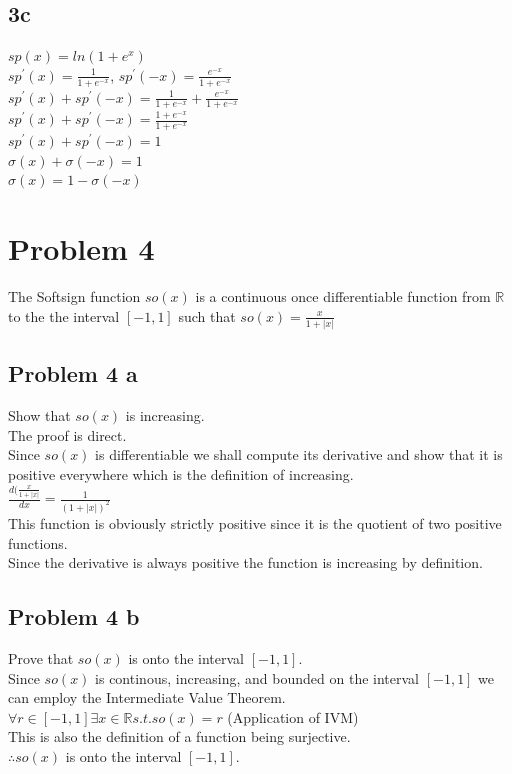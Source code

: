 \documentclass[a4paper,12pt]{article}
\begin{document}
\subsection{3c}
$sp(x)=ln(1+e^x)$\\
$sp^{'}(x) = \frac{1}{1+e^{-x}}$,  $sp^{'}(-x) = \frac{e^{-x}}{1+e^{-x}}$\\
$sp^{'}(x) + sp^{'}(-x) = \frac{1}{1+e^{-x}} + \frac{e^{-x}}{1+e^{-x}}$\\
$sp^{'}(x) + sp^{'}(-x) = \frac{1+e^{-x}}{1+e^{-x}}$\\
$sp^{'}(x) + sp^{'}(-x) = 1$\\
$\sigma(x) + \sigma(-x) = 1$\\
$\sigma(x) = 1 - \sigma(-x)$\\


\section{Problem 4}
The Softsign function $so(x)$ is a continuous once differentiable function from $\mathbb{R}$ to the the interval $[-1,1]$ such that $so(x)=\frac{x}{1+|x|}$

\subsection{Problem 4 a}
Show that $so(x)$ is increasing.\\
The proof is direct.\\
Since $so(x)$ is differentiable we shall compute its derivative and show that it is positive everywhere which is the definition of increasing.\\
$\frac{d(\frac{x}{1+|x|}}{dx} = \frac{1}{(1+|x|)^2}$\\
This function is obviously strictly positive since it is the quotient of two positive functions.\\
Since the derivative is always positive the function is increasing by definition.

\subsection{Problem 4 b}
Prove that $so(x)$ is onto the interval $[-1,1]$.\\
Since $so(x)$ is continous, increasing, and bounded on the interval $[-1,1]$ we can employ the Intermediate Value Theorem.\\
$\forall r \in [-1,1] \exists x \in \mathbb{R} s.t. so(x) = r$ (Application of IVM)\\
This is also the definition of a function being surjective.\\
$\therefore so(x)$ is onto the interval $[-1,1]$.\\
\end{document}
